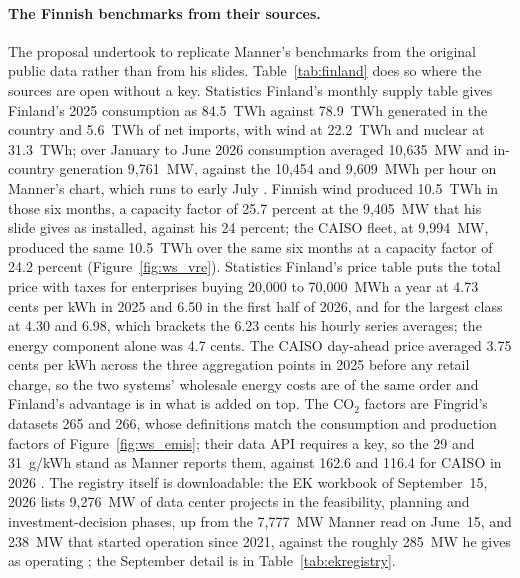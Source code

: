 \paragraph{The Finnish benchmarks from their sources.} The proposal undertook to replicate Manner's benchmarks from the original public data rather than from his slides. Table~\ref{tab:finland} does so where the sources are open without a key. Statistics Finland's monthly supply table gives Finland's 2025 consumption as 84.5~TWh against 78.9~TWh generated in the country and 5.6~TWh of net imports, with wind at 22.2~TWh and nuclear at 31.3~TWh; over January to June 2026 consumption averaged 10,635~MW and in-country generation 9,761~MW, against the 10,454 and 9,609~MWh per hour on Manner's chart, which runs to early July \citep{statfin2026,manner2026}. Finnish wind produced 10.5~TWh in those six months, a capacity factor of 25.7 percent at the 9,405~MW that his slide gives as installed, against his 24 percent; the CAISO fleet, at 9,994~MW, produced the same 10.5~TWh over the same six months at a capacity factor of 24.2 percent (Figure~\ref{fig:ws_vre}). Statistics Finland's price table puts the total price with taxes for enterprises buying 20,000 to 70,000~MWh a year at 4.73 cents per kWh in 2025 and 6.50 in the first half of 2026, and for the largest class at 4.30 and 6.98, which brackets the 6.23 cents his hourly series averages; the energy component alone was 4.7 cents. The CAISO day-ahead price averaged 3.75 cents per kWh across the three aggregation points in 2025 before any retail charge, so the two systems' wholesale energy costs are of the same order and Finland's advantage is in what is added on top. The CO$_2$ factors are Fingrid's datasets 265 and 266, whose definitions match the consumption and production factors of Figure~\ref{fig:ws_emis}; their data API requires a key, so the 29 and 31~g/kWh stand as Manner reports them, against 162.6 and 116.4 for CAISO in 2026 \citep{fingrid_opendata}. The registry itself is downloadable: the EK workbook of September~15, 2026 lists 9,276~MW of data center projects in the feasibility, planning and investment-decision phases, up from the 7,777~MW Manner read on June~15, and 238~MW that started operation since 2021, against the roughly 285~MW he gives as operating \citep{ek_dashboard}; the September detail is in Table~\ref{tab:ekregistry}.

\begin{table}[H]
\centering\scriptsize
\caption{Finnish benchmarks replicated from Statistics Finland, Fingrid's dataset definitions and the EK registry, with the values Manner's slides give where the source needs a key, and the CAISO counterparts from this chapter.}
\label{tab:finland}
\resizebox{\textwidth}{!}{}
\end{table}

